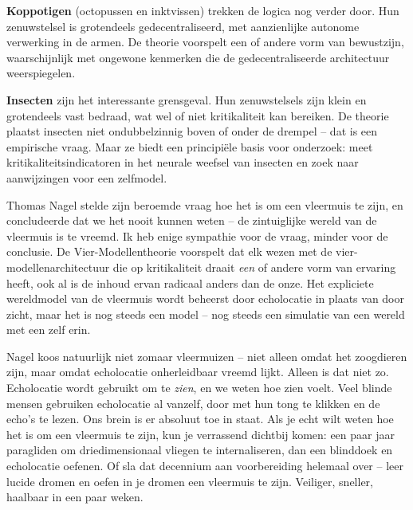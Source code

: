 \documentclass[11pt, twoside, openright]{book}
\begin{document}
\textbf{Koppotigen} (octopussen en inktvissen) trekken de logica nog verder door. Hun zenuwstelsel is grotendeels gedecentraliseerd, met aanzienlijke autonome verwerking in de armen. De theorie voorspelt een of andere vorm van bewustzijn, waarschijnlijk met ongewone kenmerken die de gedecentraliseerde architectuur weerspiegelen.

\textbf{Insecten} zijn het interessante grensgeval. Hun zenuwstelsels zijn klein en grotendeels vast bedraad, wat wel of niet kritikaliteit kan bereiken. De theorie plaatst insecten niet ondubbelzinnig boven of onder de drempel -- dat is een empirische vraag. Maar ze biedt een principiële basis voor onderzoek: meet kritikaliteitsindicatoren in het neurale weefsel van insecten en zoek naar aanwijzingen voor een zelfmodel.

Thomas Nagel stelde zijn beroemde vraag hoe het is om een vleermuis te zijn, en concludeerde dat we het nooit kunnen weten -- de zintuiglijke wereld van de vleermuis is te vreemd. Ik heb enige sympathie voor de vraag, minder voor de conclusie. De Vier-Modellentheorie voorspelt dat elk wezen met de vier-modellenarchitectuur die op kritikaliteit draait \textit{een} of andere vorm van ervaring heeft, ook al is de inhoud ervan radicaal anders dan de onze. Het expliciete wereldmodel van de vleermuis wordt beheerst door echolocatie in plaats van door zicht, maar het is nog steeds een model -- nog steeds een simulatie van een wereld met een zelf erin.

Nagel koos natuurlijk niet zomaar vleermuizen -- niet alleen omdat het zoogdieren zijn, maar omdat echolocatie onherleidbaar vreemd lijkt. Alleen is dat niet zo. Echolocatie wordt gebruikt om te \textit{zien}, en we weten hoe zien voelt. Veel blinde mensen gebruiken echolocatie al vanzelf, door met hun tong te klikken en de echo's te lezen. Ons brein is er absoluut toe in staat. Als je echt wilt weten hoe het is om een vleermuis te zijn, kun je verrassend dichtbij komen: een paar jaar paragliden om driedimensionaal vliegen te internaliseren, dan een blinddoek en echolocatie oefenen. Of sla dat decennium aan voorbereiding helemaal over -- leer lucide dromen en oefen in je dromen een vleermuis te zijn. Veiliger, sneller, haalbaar in een paar weken.
\end{document}
